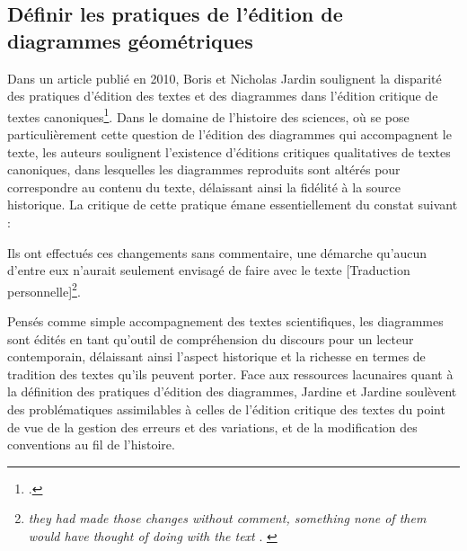
\subsection{Définir les pratiques de l'édition de diagrammes géométriques}
Dans un article publié en 2010, Boris et Nicholas Jardin soulignent la disparité des pratiques d'édition des textes et des diagrammes dans l'édition critique de textes canoniques\footcite{jardineCriticalEditingEarlyModern2010}. Dans le domaine de l'histoire des sciences, où se pose particulièrement cette question de l'édition des diagrammes qui accompagnent le texte, les auteurs soulignent l'existence d'éditions critiques qualitatives de textes canoniques, dans lesquelles les diagrammes reproduits sont altérés pour correspondre au contenu du texte, délaissant ainsi la fidélité à la source historique. La critique de cette pratique émane essentiellement du constat suivant :

\begin{displayquote}
	Ils ont effectués ces changements sans commentaire, une démarche qu'aucun d'entre eux n'aurait seulement envisagé de faire avec le texte [Traduction personnelle]\footnote{\textit{\og they had made those changes without comment, something none of them would have thought of doing with the text \fg}. \cite{jardineCriticalEditingEarlyModern2010}}.
\end{displayquote}

Pensés comme simple accompagnement des textes scientifiques, les diagrammes sont édités en tant qu'outil de compréhension du discours pour un lecteur contemporain, délaissant ainsi l'aspect historique et la richesse en termes de tradition des textes qu'ils peuvent porter. Face aux ressources lacunaires quant à la définition des pratiques d'édition des diagrammes, Jardine et Jardine soulèvent des problématiques assimilables à celles de l'édition critique des textes du point de vue de la gestion des erreurs et des variations, et de la modification des conventions au fil de l'histoire. 

